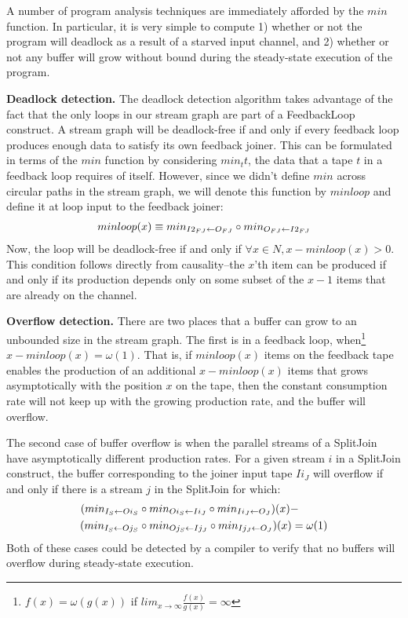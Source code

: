 A number of program analysis techniques are immediately afforded by
the $min$ function.  In particular, it is very simple to compute 1)
whether or not the program will deadlock as a result of a starved
input channel, and 2) whether or not any buffer will grow without
bound during the steady-state execution of the program.

{\bf Deadlock detection.}  The deadlock detection algorithm takes
advantage of the fact that the only loops in our stream graph are part
of a FeedbackLoop construct.  A stream graph will be deadlock-free if
and only if every feedback loop produces enough data to satisfy its
own feedback joiner.  This can be formulated in terms of the $min$
function by considering $min_{t}{t}$, the data that a tape $t$ in a
feedback loop requires of itself.  However, since we didn't define
$min$ across circular paths in the stream graph, we will denote this
function by $minloop$ and define it at loop input to the feedback
joiner:
\begin{align*}
minloop(x) \equiv min_{I2_{FJ} \leftarrow O_{FJ}} \circ min_{O_{FJ} \leftarrow I2_{FJ}}
\end{align*}
Now, the loop will be deadlock-free if and only if $\forall x \in N, x
- minloop(x) > 0$.  This condition follows directly from
causality--the $x$'th item can be produced if and only if its
production depends only on some subset of the $x-1$ items that are
already on the channel.

{\bf Overflow detection.}  There are two places that a buffer can grow
to an unbounded size in the stream graph.  The first is in a feedback
loop, when\footnote{$f(x) = \omega(g(x))$ if $lim_{x \rightarrow
\infty}\frac{f(x)}{g(x)} = \infty$}~$x - minloop(x) = \omega(1)$.
That is, if $minloop(x)$ items on the feedback tape enables the
production of an additional $x - minloop(x)$ items that grows
asymptotically with the position $x$ on the tape, then the constant
consumption rate will not keep up with the growing production rate,
and the buffer will overflow.

The second case of buffer overflow is when the parallel streams of a
SplitJoin have asymptotically different production rates.  For a given
stream $i$ in a SplitJoin construct, the buffer corresponding to the
joiner input tape $Ii_J$ will overflow if and only if there is a
stream $j$ in the SplitJoin for which:
\begin{align*}
(min_{I_S \leftarrow Oi_S}& \circ min_{Oi_S \leftarrow Ii_J} \circ min_{Ii_J \leftarrow O_J})(x) - \\
(min_{I_S \leftarrow Oj_S}& \circ min_{Oj_S \leftarrow Ij_J} \circ min_{Ij_J \leftarrow O_J})(x) = \omega(1)
\end{align*}
Both of these cases could be detected by a compiler to verify that no
buffers will overflow during steady-state execution.

